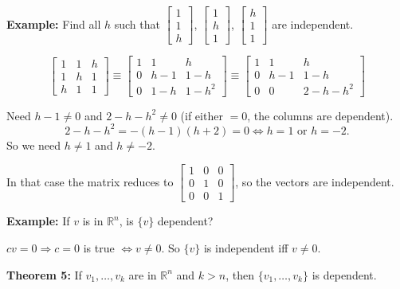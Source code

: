 \documentclass{article}
\begin{document}
\newpage

\textbf{Example:} Find all $h$ such that $\begin{bmatrix} 1 \\ 1 \\ h \end{bmatrix}$, $\begin{bmatrix} 1 \\ h \\ 1 \end{bmatrix}$, $\begin{bmatrix} h \\ 1 \\ 1 \end{bmatrix}$ are independent.

\[
\begin{bmatrix} 1 & 1 & h \\ 1 & h & 1 \\ h & 1 & 1 \end{bmatrix}
\equiv
\begin{bmatrix} 1 & 1 & h \\ 0 & h-1 & 1-h \\ 0 & 1-h & 1-h^2 \end{bmatrix}
\equiv
\begin{bmatrix} 1 & 1 & h \\ 0 & h-1 & 1-h \\ 0 & 0 & 2-h-h^2 \end{bmatrix}
\]

\medskip

Need $h - 1 \neq 0$ and $2 - h - h^2 \neq 0$ (if either $= 0$, the columns are dependent).
\[
2 - h - h^2 = -(h-1)(h+2) = 0 \iff h = 1 \text{ or } h = -2.
\]
So we need $h \neq 1$ and $h \neq -2$.

\medskip

In that case the matrix reduces to $\begin{bmatrix} 1 & 0 & 0 \\ 0 & 1 & 0 \\ 0 & 0 & 1 \end{bmatrix}$, so the vectors are independent.

\bigskip

\textbf{Example:} If $v$ is in $\mathbb{R}^n$, is $\{v\}$ dependent?

\medskip

$cv = 0 \Rightarrow c = 0$ is true $\iff v \neq 0$. So $\{v\}$ is independent iff $v \neq 0$.

\newpage

\textbf{Theorem 5:} If $v_1, \ldots, v_k$ are in $\mathbb{R}^n$ and $k > n$, then $\{v_1, \ldots, v_k\}$ is dependent.
\end{document}
